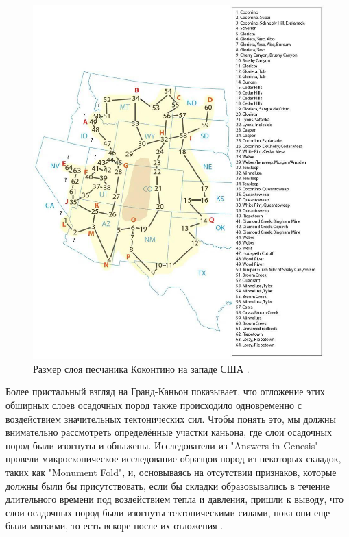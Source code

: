 \documentclass[10pt,twocolumn,letterpaper]{article}
\begin{document}
\begin{figure}[t]
\begin{center}
   \includegraphics[width=1\linewidth]{coconino.jpg}
\end{center}
   \caption{Размер слоя песчаника Коконтино на западе США \cite{21}.}
\label{fig:3}
\label{fig:onecol}
\end{figure}

Более пристальный взгляд на Гранд-Каньон показывает, что отложение этих обширных слоев осадочных пород также происходило одновременно с воздействием значительных тектонических сил. Чтобы понять это, мы должны внимательно рассмотреть определённые участки каньона, где слои осадочных пород были изогнуты и обнажены. Исследователи из "Answers in Genesis" \cite{42} провели микроскопическое исследование образцов пород из некоторых складок, таких как "Monument Fold", и, основываясь на отсутствии признаков, которые должны были бы присутствовать, если бы складки образовывались в течение длительного времени под воздействием тепла и давления, пришли к выводу, что слои осадочных пород были изогнуты тектоническими силами, пока они еще были мягкими, то есть вскоре после их отложения \cite{43}.
\end{document}
